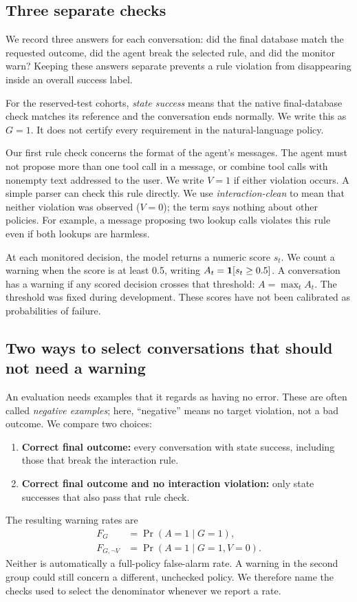 \subsection{Three separate checks}
We record three answers for each conversation: did the final database match the requested outcome, did the agent break the selected rule, and did the monitor warn? Keeping these answers separate prevents a rule violation from disappearing inside an overall success label.

For the reserved-test cohorts, \emph{state success} means that the native final-database check matches its reference and the conversation ends normally. We write this as $G=1$. It does not certify every requirement in the natural-language policy.

Our first rule check concerns the format of the agent's messages. The agent must not propose more than one tool call in a message, or combine tool calls with nonempty text addressed to the user. We write $V=1$ if either violation occurs. A simple parser can check this rule directly. We use \emph{interaction-clean} to mean that neither violation was observed ($V=0$); the term says nothing about other policies. For example, a message proposing two lookup calls violates this rule even if both lookups are harmless.

At each monitored decision, the model returns a numeric score $s_t$. We count a warning when the score is at least 0.5, writing $A_t=\mathbf{1}[s_t\geq0.5]$. A conversation has a warning if any scored decision crosses that threshold: $A=\max_t A_t$. The threshold was fixed during development. These scores have not been calibrated as probabilities of failure.

\subsection{Two ways to select conversations that should not need a warning}
An evaluation needs examples that it regards as having no error. These are often called \emph{negative examples}; here, ``negative'' means no target violation, not a bad outcome. We compare two choices:
\begin{enumerate}
\item \textbf{Correct final outcome:} every conversation with state success, including those that break the interaction rule.
\item \textbf{Correct final outcome and no interaction violation:} only state successes that also pass that rule check.
\end{enumerate}
The resulting warning rates are
\begin{align}
 F_G &= \Pr(A=1\mid G=1),\\
 F_{G,\neg V} &= \Pr(A=1\mid G=1,V=0).
\end{align}
Neither is automatically a full-policy false-alarm rate. A warning in the second group could still concern a different, unchecked policy. We therefore name the checks used to select the denominator whenever we report a rate.

